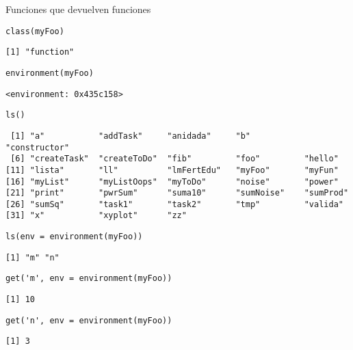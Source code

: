 \documentclass[xcolor={usenames,svgnames,dvipsnames}]{beamer}
\begin{document}
\begin{frame}[fragile,label={sec:orgheadline18}]{Funciones que devuelven funciones}
 \lstset{language=R,label= ,caption= ,captionpos=b,numbers=none}
\begin{lstlisting}
class(myFoo)
\end{lstlisting}

\begin{verbatim}
[1] "function"
\end{verbatim}

\lstset{language=R,label= ,caption= ,captionpos=b,numbers=none}
\begin{lstlisting}
environment(myFoo)
\end{lstlisting}

\begin{verbatim}
<environment: 0x435c158>
\end{verbatim}

\lstset{language=R,label= ,caption= ,captionpos=b,numbers=none}
\begin{lstlisting}
ls()
\end{lstlisting}

\begin{verbatim}
 [1] "a"           "addTask"     "anidada"     "b"           "constructor"
 [6] "createTask"  "createToDo"  "fib"         "foo"         "hello"      
[11] "lista"       "ll"          "lmFertEdu"   "myFoo"       "myFun"      
[16] "myList"      "myListOops"  "myToDo"      "noise"       "power"      
[21] "print"       "pwrSum"      "suma10"      "sumNoise"    "sumProd"    
[26] "sumSq"       "task1"       "task2"       "tmp"         "valida"     
[31] "x"           "xyplot"      "zz"
\end{verbatim}

\lstset{language=R,label= ,caption= ,captionpos=b,numbers=none}
\begin{lstlisting}
ls(env = environment(myFoo))
\end{lstlisting}

\begin{verbatim}
[1] "m" "n"
\end{verbatim}

\lstset{language=R,label= ,caption= ,captionpos=b,numbers=none}
\begin{lstlisting}
get('m', env = environment(myFoo))
\end{lstlisting}

\begin{verbatim}
[1] 10
\end{verbatim}

\lstset{language=R,label= ,caption= ,captionpos=b,numbers=none}
\begin{lstlisting}
get('n', env = environment(myFoo))
\end{lstlisting}

\begin{verbatim}
[1] 3
\end{verbatim}
\end{frame}
\end{document}

